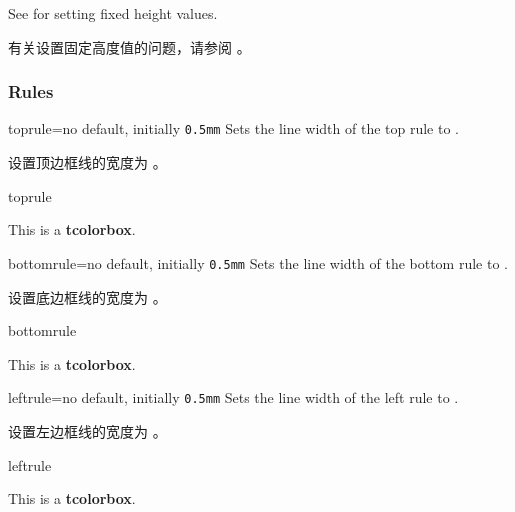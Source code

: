 See  for setting fixed height values.

有关设置固定高度值的问题，请参阅 。



\subsubsection{Rules}
\begin{docTcbKey}{toprule}{=}{no default, initially \texttt{0.5mm}}
Sets the line width of the top rule to .

设置顶边框线的宽度为 。
\begin{exdispExample}{toprule}

\begin{tcolorbox}[toprule=3mm]
This is a \textbf{tcolorbox}.
\end{tcolorbox}
\end{exdispExample}
\end{docTcbKey}


\begin{docTcbKey}{bottomrule}{=}{no default, initially \texttt{0.5mm}}
Sets the line width of the bottom rule to .

设置底边框线的宽度为 。
\begin{exdispExample}{bottomrule}

\begin{tcolorbox}[bottomrule=3mm]
This is a \textbf{tcolorbox}.
\end{tcolorbox}
\end{exdispExample}
\end{docTcbKey}

\begin{docTcbKey}{leftrule}{=}{no default, initially \texttt{0.5mm}}
Sets the line width of the left rule to .

设置左边框线的宽度为 。
\begin{exdispExample}{leftrule}

\begin{tcolorbox}[leftrule=3mm]
This is a \textbf{tcolorbox}.
\end{tcolorbox}
\end{exdispExample}
\end{docTcbKey}


